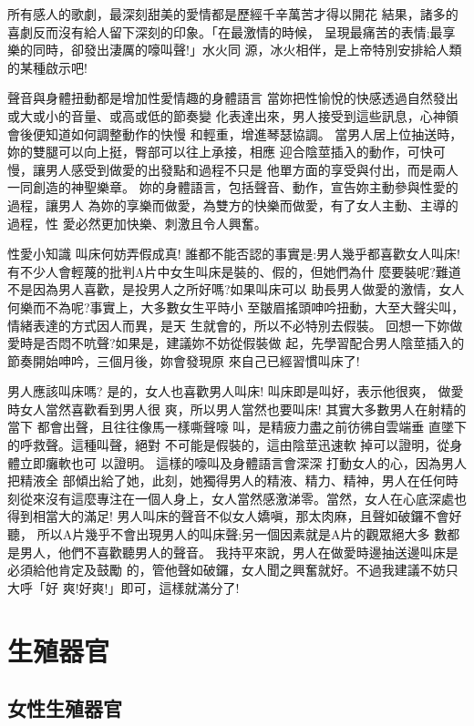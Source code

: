 \documentclass[12pt,UTF8]{ctexbook}
\begin{document}
所有感人的歌劇，最深刻甜美的愛情都是歷經千辛萬苦才得以開花
結果，諸多的喜劇反而沒有給人留下深刻的印象。「在最激情的時候，
呈現最痛苦的表情;最享樂的同時，卻發出淒厲的嚎叫聲!」水火同
源，冰火相伴，是上帝特別安排給人類的某種啟示吧!

聲音與身體扭動都是增加性愛情趣的身體語言
當妳把性愉悅的快感透過自然發出或大或小的音量、或高或低的節奏變
化表達出來，男人接受到這些訊息，心神領會後便知道如何調整動作的快慢
和輕重，增進琴瑟協調。
當男人居上位抽送時，妳的雙腿可以向上挺，臀部可以往上承接，相應
迎合陰莖插入的動作，可快可慢，讓男人感受到做愛的出發點和過程不只是
他單方面的享受與付出，而是兩人一同創造的神聖樂章。
妳的身體語言，包括聲音、動作，宣告妳主動參與性愛的過程，讓男人
為妳的享樂而做愛，為雙方的快樂而做愛，有了女人主動、主導的過程，性
愛必然更加快樂、刺激且令人興奮。

性愛小知識
叫床何妨弄假成真!
誰都不能否認的事實是:男人幾乎都喜歡女人叫床!
有不少人會輕蔑的批判A片中女生叫床是裝的、假的，但她們為什
麼要裝呢?難道不是因為男人喜歡，是投男人之所好嗎?如果叫床可以
助長男人做愛的激情，女人何樂而不為呢?事實上，大多數女生平時小
至皺眉搖頭呻吟扭動，大至大聲尖叫，情緒表達的方式因人而異，是天
生就會的，所以不必特別去假裝。
回想一下妳做愛時是否悶不吭聲?如果是，建議妳不妨從假裝做
起，先學習配合男人陰莖插入的節奏開始呻吟，三個月後，妳會發現原
來自己已經習慣叫床了!

男人應該叫床嗎?
是的，女人也喜歡男人叫床!
叫床即是叫好，表示他很爽，
做愛時女人當然喜歡看到男人很
爽，所以男人當然也要叫床!
其實大多數男人在射精的當下
都會出聲，且往往像馬一樣嘶聲嚎
叫，是精疲力盡之前彷彿自雲端垂
直墜下的呼救聲。這種叫聲，絕對
不可能是假裝的，這由陰莖迅速軟
掉可以證明，從身體立即癱軟也可
以證明。
這樣的嚎叫及身體語言會深深
打動女人的心，因為男人把精液全
部傾出給了她，此刻，她獨得男人的精液、精力、精神，男人在任何時
刻從來沒有這麼專注在一個人身上，女人當然感激涕零。當然，女人在心底深處也得到相當大的滿足!
男人叫床的聲音不似女人嬌嗔，那太肉麻，且聲如破鑼不會好聽，
所以A片幾乎不會出現男人的叫床聲;另一個因素就是A片的觀眾絕大多
數都是男人，他們不喜歡聽男人的聲音。
我持平來說，男人在做愛時邊抽送邊叫床是必須給他肯定及鼓勵
的，管他聲如破鑼，女人聞之興奮就好。不過我建議不妨只大呼「好
爽!好爽!」即可，這樣就滿分了!

\mainmatter

\part{生殖器官}

\chapter{女性生殖器官}
\end{document}
